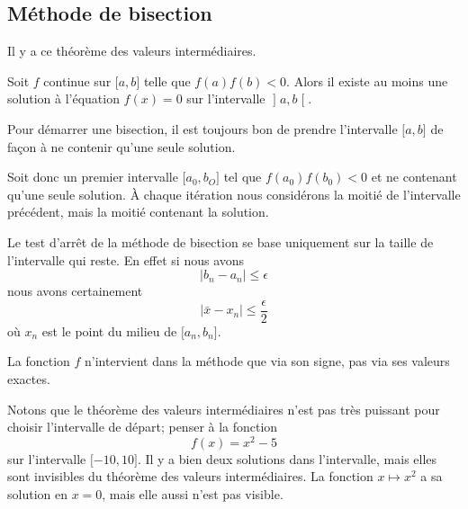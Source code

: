 \subsection{Méthode de bisection}

Il y a ce théorème des valeurs intermédiaires.
\begin{theorem}
	Soit \( f\) continue sur \( \mathopen[ a , b \mathclose]\) telle que \( f(a)f(b)<0\). Alors il existe au moins une solution à l'équation \( f(x)=0\) sur l'intervalle \( \mathopen] a , b \mathclose[\).
\end{theorem}

Pour démarrer une bisection, il est toujours bon de prendre l'intervalle \( \mathopen[ a , b \mathclose]\) de façon à ne contenir qu'une seule solution.

Soit donc un premier intervalle \( \mathopen[ a_0 , b_O \mathclose]\) tel que \( f(a_0)f(b_0)<0\) et ne contenant qu'une seule solution. À chaque itération nous considérons la moitié de l'intervalle précédent, mais la moitié contenant la solution.

Le test d'arrêt de la méthode de bisection se base uniquement sur la taille de l'intervalle qui reste. En effet si nous avons
\begin{equation}
	| b_n-a_n |\leq \epsilon
\end{equation}
nous avons certainement
\begin{equation}
	| \bar x-x_n |\leq \frac{ \epsilon }{2}
\end{equation}
où \( x_n\) est le point du milieu de \( \mathopen[ a_n , b_n \mathclose]\).

\begin{normaltext}
    La fonction \( f\) n'intervient dans la méthode que via son signe, pas via ses valeurs exactes.
\end{normaltext}

\begin{normaltext}
    Notons que le théorème des valeurs intermédiaires n'est pas très puissant pour choisir l'intervalle de départ; penser à la fonction
    \begin{equation}
        f(x)=x^2-5
    \end{equation}
    sur l'intervalle \( \mathopen[ -10 , 10 \mathclose]\). Il y a bien deux solutions dans l'intervalle, mais elles sont invisibles du théorème des valeurs intermédiaires. La fonction \( x\mapsto x^2\) a sa solution en \( x=0\), mais elle aussi n'est pas visible.
\end{normaltext}

